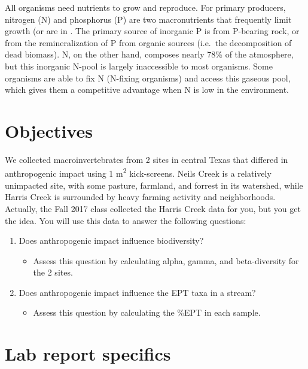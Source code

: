 \documentclass[]{book}
\providecommand{\tightlist}{%
  \setlength{\itemsep}{0pt}\setlength{\parskip}{0pt}}
\begin{document}
All organisms need nutrients to grow and reproduce. For primary producers, nitrogen (N) and phosphorus (P) are two macronutrients that frequently limit growth (or are in . The primary source of inorganic P is from P-bearing rock, or from the remineralization of P from organic sources (i.e.~the decomposition of dead biomass). N, on the other hand, composes nearly 78\% of the atmosphere, but this inorganic N-pool is largely inaccessible to most organisms. Some organisms are able to fix N (N-fixing organisms) and access this gaseous pool, which gives them a competitive advantage when N is low in the environment.

\hypertarget{objectives-4}{%
\section{Objectives}\label{objectives-4}}

We collected macroinvertebrates from 2 sites in central Texas that differed in anthropogenic impact using 1 m\textsuperscript{2} kick-screens. Neils Creek is a relatively unimpacted site, with some pasture, farmland, and forrest in its watershed, while Harris Creek is surrounded by heavy farming activity and neighborhoods. Actually, the Fall 2017 class collected the Harris Creek data for you, but you get the idea. You will use this data to answer the following questions:

\begin{enumerate}
\def\labelenumi{\arabic{enumi}.}
\tightlist
\item
  Does anthropogenic impact influence biodiversity?

  \begin{itemize}
  \tightlist
  \item
    Assess this question by calculating alpha, gamma, and beta-diversity for the 2 sites.
  \end{itemize}
\item
  Does anthropogenic impact influence the EPT taxa in a stream?

  \begin{itemize}
  \tightlist
  \item
    Assess this question by calculating the \%EPT in each sample.
  \end{itemize}
\end{enumerate}

\hypertarget{lab-report-specifics-4}{%
\section{Lab report specifics}\label{lab-report-specifics-4}}
\end{document}
